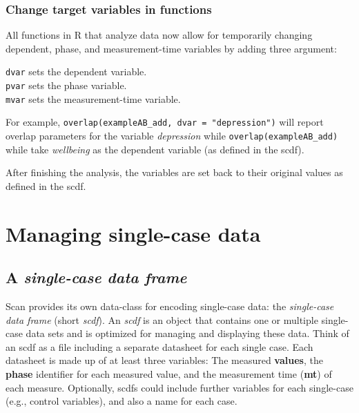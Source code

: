 \documentclass[
]{book}
\begin{document}
\hypertarget{change-target-variables-in-functions}{%
\subsection{Change target variables in functions}\label{change-target-variables-in-functions}}

All functions in R that analyze data now allow for temporarily changing dependent, phase, and measurement-time variables by adding three argument:

\texttt{dvar} sets the dependent variable.\\
\texttt{pvar} sets the phase variable.\\
\texttt{mvar} sets the measurement-time variable.

For example, \texttt{overlap(exampleAB\_add,\ dvar\ =\ "depression")} will report overlap parameters for the variable \emph{depression} while \texttt{overlap(exampleAB\_add)} while take \emph{wellbeing} as the dependent variable (as defined in the scdf).

After finishing the analysis, the variables are set back to their original values as defined in the scdf.

\hypertarget{managing-single-case-data}{%
\chapter{Managing single-case data}\label{managing-single-case-data}}

\hypertarget{a-single-case-data-frame}{%
\section{\texorpdfstring{A \textbf{\emph{single-case data frame}}}{A single-case data frame}}\label{a-single-case-data-frame}}

Scan provides its own data-class for encoding single-case data: the \emph{single-case data frame} (short \emph{scdf}). An \emph{scdf} is an object that contains one or multiple single-case data sets and is optimized for managing and displaying these data. Think of an scdf as a file including a separate datasheet for each single case. Each datasheet is made up of at least three variables: The measured \textbf{values}, the \textbf{phase} identifier for each measured value, and the measurement time (\textbf{mt}) of each measure. Optionally, scdfs could include further variables for each single-case (e.g., control variables), and also a name for each case.
\end{document}
